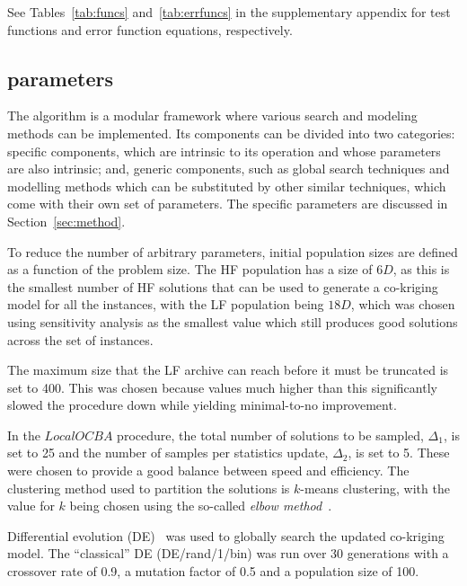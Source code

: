 See Tables~\ref{tab:funcs} and~\ref{tab:errfuncs} in the supplementary appendix for test functions and error function equations, respectively.%

\subsection{\AlgName{} parameters}
The \AlgName{} algorithm is a modular framework where various search and modeling methods can be implemented. Its components can be divided into two categories: \AlgName{} specific components, which are intrinsic to its operation and whose parameters are also intrinsic; and, generic components, such as global search techniques and modelling methods which can be substituted by other similar techniques, which come with their own set of parameters. The \AlgName{} specific parameters are discussed in Section~\ref{sec:method}.

To reduce the number of arbitrary parameters, initial population sizes are defined as a function of the problem size. The HF population has a size of $6D$, as this is the smallest number of HF solutions that can be used to generate a co-kriging model for all the instances, with the LF population being $18D$, which was chosen using sensitivity analysis as the smallest value which still produces good solutions across the set of instances.

The maximum size that the LF archive can reach before it must be truncated is set to 400. This was chosen because values much higher than this significantly slowed the procedure down while yielding minimal-to-no improvement. 

In the $LocalOCBA$ procedure, the total number of solutions to be sampled, $\Delta_1$, is set to 25 and the number of samples per statistics update, $\Delta_2$, is set to 5. These were chosen to provide a good balance between speed and efficiency. The clustering method used to partition the solutions is $k$-means clustering, with the value for $k$ being chosen using the so-called \emph{elbow method}~\cite{leonard1990finding}.

Differential evolution (DE)~\cite{storn1997differential} was used to globally search the updated co-kriging model. The ``classical'' DE (DE/rand/1/bin) was run over 30 generations with a crossover rate of 0.9, a mutation factor of 0.5 and a population size of 100.

